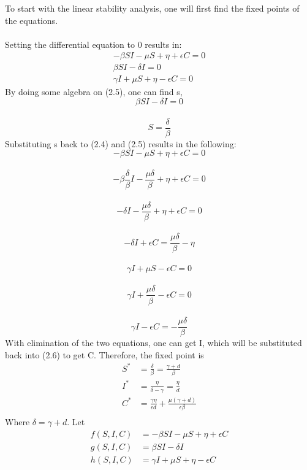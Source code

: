 \documentclass[a4paper, final, 12pt]{article}
\numberwithin{equation}{section}
\begin{document}
To start with the linear stability analysis, one will first find the fixed points of the equations. \\\\
Setting the differential equation to 0 results in: \\
\begin{align}
    -\beta SI - \mu S + \eta + \epsilon C = 0 \\
    \beta SI - \delta I = 0 \\
     \gamma I + \mu S + \eta - \epsilon C = 0
\end{align}
By doing some algebra on (2.5), one can find s, \\
$$\beta S I - \delta I = 0$$\\
$$S = \frac{\delta}{\beta}$$
Substituting s back to (2.4) and (2.5) results in the following: \\
$$-\beta S I - \mu S + \eta + \epsilon C = 0$$\\
$$-\beta \frac{\delta}{\beta}I - \frac{\mu \delta}{\beta} + \eta + \epsilon C = 0$$\\
$$-\delta I - \frac{\mu \delta}{\beta} + \eta + \epsilon C = 0$$\\
$$-\delta I + \epsilon C = \frac{\mu \delta}{\beta} - \eta$$\\
$$\gamma I + \mu S - \epsilon C = 0$$\\
$$\gamma I + \frac{\mu \delta}{\beta} -\epsilon C = 0$$ \\
$$\gamma I - \epsilon C = -\frac{\mu \delta}{\beta}$$
With elimination of the two equations, one can get I, which will be substituted back into (2.6) to get C. Therefore, the fixed point is\\
\begin{equation} \label{eq1}
\begin{split}
    S^* & = \frac{\delta}{\beta} = \frac{\gamma + d}{\beta}\\
    I^* & = \frac{\eta}{\delta - \gamma} = \frac{\eta}{d}\\
    C^* & = \frac{\gamma \eta}{\epsilon d} + \frac{\mu (\gamma + d)}{\epsilon \beta}\\
\end{split}
\end{equation}
Where $\delta = \gamma + d$. Let\\
\begin{align}
    f(S,I,C) &= -\beta SI - \mu S + \eta + \epsilon C \\
    g(S,I,C) &= \beta SI - \delta I\\
     h(S,I,C) &= \gamma I + \mu S + \eta - \epsilon C
\end{align}
\end{document}
